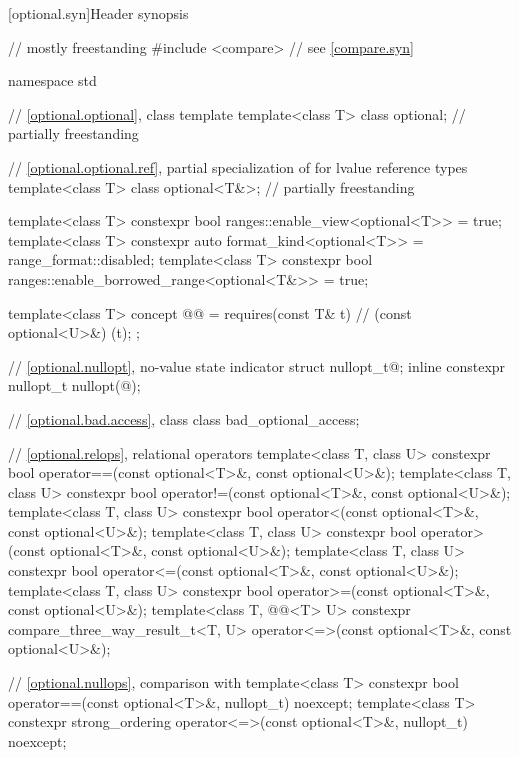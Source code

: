 [optional.syn]{Header  synopsis}

%
\begin{codeblock}
// mostly freestanding
#include <compare>              // see \ref{compare.syn}

namespace std {
  // \ref{optional.optional}, class template 
  template<class T>
    class optional;                                             // partially freestanding

  // \ref{optional.optional.ref}, partial specialization of  for lvalue reference types
  template<class T>
    class optional<T&>;                                         // partially freestanding

  template<class T>
    constexpr bool ranges::enable_view<optional<T>> = true;
  template<class T>
    constexpr auto format_kind<optional<T>> = range_format::disabled;
  template<class T>
    constexpr bool ranges::enable_borrowed_range<optional<T&>> = true;

  template<class T>
    concept @@ = requires(const T& t) {   // (const optional<U>&){ }(t);
    };

  // \ref{optional.nullopt}, no-value state indicator
  struct nullopt_t{@\seebelow@};
  inline constexpr nullopt_t nullopt(@\unspec@);

  // \ref{optional.bad.access}, class 
  class bad_optional_access;

  // \ref{optional.relops}, relational operators
  template<class T, class U>
    constexpr bool operator==(const optional<T>&, const optional<U>&);
  template<class T, class U>
    constexpr bool operator!=(const optional<T>&, const optional<U>&);
  template<class T, class U>
    constexpr bool operator<(const optional<T>&, const optional<U>&);
  template<class T, class U>
    constexpr bool operator>(const optional<T>&, const optional<U>&);
  template<class T, class U>
    constexpr bool operator<=(const optional<T>&, const optional<U>&);
  template<class T, class U>
    constexpr bool operator>=(const optional<T>&, const optional<U>&);
  template<class T, @@<T> U>
    constexpr compare_three_way_result_t<T, U>
      operator<=>(const optional<T>&, const optional<U>&);

  // \ref{optional.nullops}, comparison with 
  template<class T> constexpr bool operator==(const optional<T>&, nullopt_t) noexcept;
  template<class T>
    constexpr strong_ordering operator<=>(const optional<T>&, nullopt_t) noexcept;

}
\end{codeblock}
